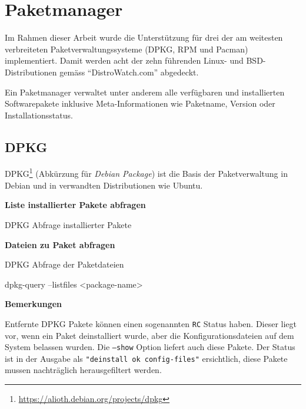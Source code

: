 

\section{Paketmanager}
\label{swidgenerator:paketmanager}

Im Rahmen dieser Arbeit wurde die Unterstützung für drei der am weitesten
verbreiteten Paketverwaltungssysteme (DPKG, RPM und Pacman) implementiert. Damit
werden acht der zehn führenden Linux- und BSD-Distributionen gemäss
\enquote{DistroWatch.com}\cite{distrowatch:2014} abgedeckt.

Ein Paketmanager verwaltet unter anderem alle verfügbaren und installierten
Softwarepakete inklusive Meta-Informationen wie Paketname, Version oder
Installationsstatus.

\subsection{DPKG}

DPKG\footnote{\url{https://alioth.debian.org/projects/dpkg}} (Abkürzung für
\textit{Debian Package}) ist die Basis der Paketverwaltung in Debian und in
verwandten Distributionen wie Ubuntu.

\textbf{Liste installierter Pakete abfragen}

\begin{listing}
\caption{DPKG Abfrage installierter Pakete}
\end{listing}

\textbf{Dateien zu Paket abfragen}

\begin{listing}
\caption{DPKG Abfrage der Paketdateien}
\end{listing}
\begin{bashcode}
dpkg-query --listfiles <package-name>
\end{bashcode}

\textbf{Bemerkungen}

Entfernte DPKG Pakete können einen sogenannten \texttt{RC} Status haben. Dieser liegt
vor, wenn ein Paket deinstalliert wurde, aber die Konfigurationsdateien auf dem
System belassen wurden. Die \texttt{---show} Option liefert auch diese Pakete.
Der Status ist in der Ausgabe als \texttt{"deinstall ok config-files"}
ersichtlich, diese Pakete mussen nachträglich herausgefiltert werden.


